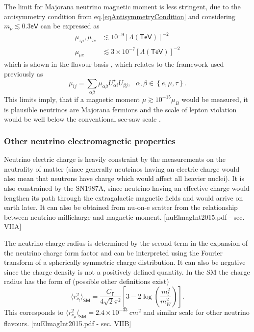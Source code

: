 The limit for Majorana neutrino magnetic moment is less stringent, due to the antisymmetry condition from eq.\ref{eqAntisymmetryCondition} and considering $m_{\nu}\lesssim 0.3\textsf{eV}$ can be expressed as
\begin{align}
\mu_{\tau\mu},\mu_{\tau e} &\lesssim 10^{-9}\left[\Lambda\left(\textsf{TeV}\right)\right]^{-2}\\
\mu_{\mu e} &\lesssim 3\times 10^{-7}\left[\Lambda\left(\textsf{TeV}\right)\right]^{-2}
\end{align}
which is shown in the flavour basis , which relates to the framework used previously as
\begin{equation}
\mu_{ij}=\sum_{\alpha\beta}\mu_{\alpha\beta}U^{\star}_{\alpha i}U_{\beta j},\ \ \ \alpha,\beta\in\left\lbrace e,\mu,\tau\right\rbrace.
\end{equation}
This limits imply, that if a magnetic moment $\mu\gtrsim 10^{-15}\mu_B$ would be measured, it is plausible neutrinos are Majorana fermions and the scale of lepton violation would be well below the conventional see-saw scale \cite{nuMMMajoranaBounds2006.pdf}.

\subsubsection{Other neutrino electromagnetic properties}

Neutrino electric charge is heavily constraint by the measurements on the neutrality of matter (since generally neutrinos having an electric charge would also mean that neutrons have charge which would affect all heavier nuclei). It is also constrained by the SN1987A, since neutrino having an effective charge would lengthen its path through the extragalactic magnetic fields and would arrive on earth later. It can also be obtained from nu-on-e scatter from the relationship between neutrino millicharge and magnetic moment. [nuElmagInt2015.pdf - sec. VIIA]

The neutrino charge radius is determined by the second term in the expansion of the neutrino charge form factor and can be interpreted using the Fourier transform of a spherically symmetric charge distribution. It can also be negative since the charge density is not a positively defined quantity. In the SM the charge radius has the form of (possible other definitions exist)
\begin{equation}
\langle r_{\nu_l}^2\rangle_{\textsf{SM}}=\frac{G_{\textsf{F}}}{4\sqrt{2}\pi^2}\left[3-2\log\left(\frac{m_l^2}{m_W^2}\right)\right].
\end{equation}
This corresponds to $\langle r_{\nu_{\mu}}^2\langle_{\textsf{SM}}=2.4\times 10^{-33}\ \unit{cm^2}$ and similar scale for other neutrino flavours. [nuElmagInt2015.pdf - sec. VIIB]

